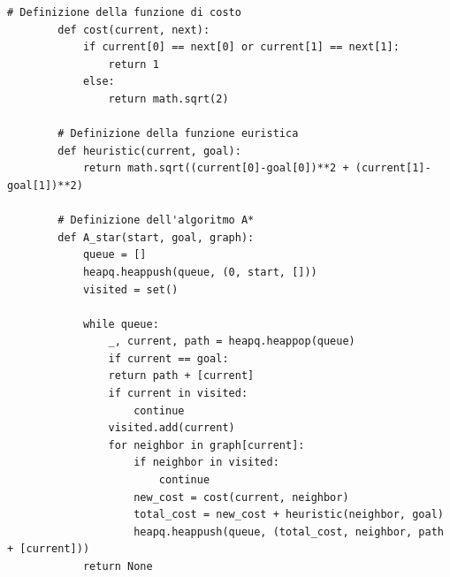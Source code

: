 \begin{minipage}{\textwidth}
	\begin{lstlisting}[caption={Algoritmo A*}]
		# Definizione della funzione di costo
		def cost(current, next):
			if current[0] == next[0] or current[1] == next[1]:
				return 1
			else:
				return math.sqrt(2)
		
		# Definizione della funzione euristica
		def heuristic(current, goal):
			return math.sqrt((current[0]-goal[0])**2 + (current[1]-goal[1])**2)
		
		# Definizione dell'algoritmo A*
		def A_star(start, goal, graph):
			queue = []
			heapq.heappush(queue, (0, start, []))
			visited = set()
			
			while queue:
				_, current, path = heapq.heappop(queue)
				if current == goal:
				return path + [current]
				if current in visited:
					continue
				visited.add(current)
				for neighbor in graph[current]:
					if neighbor in visited:
						continue
					new_cost = cost(current, neighbor)
					total_cost = new_cost + heuristic(neighbor, goal)
					heapq.heappush(queue, (total_cost, neighbor, path + [current]))
			return None
	\end{lstlisting}
\end{minipage}

